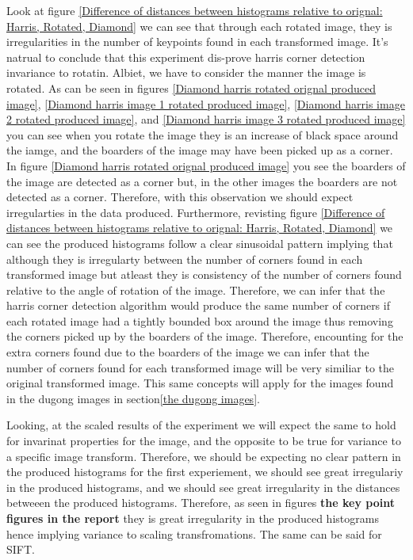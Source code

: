 \documentclass[conference]{IEEEtran}
\begin{document}
Look at figure \ref{Difference of distances between histograms relative to orignal: Harris, Rotated, Diamond} we can see that through each rotated image, they is irregularities in the number of keypoints found in each transformed image. It's natrual to conclude that this experiment dis-prove harris corner detection invariance to rotatin. Albiet, we have to consider the manner the image is rotated. As can be seen in figures \ref{Diamond harris rotated orignal produced image}, \ref{Diamond harris image 1 rotated produced image}, \ref{Diamond harris image 2 rotated produced image}, and \ref{Diamond harris image 3 rotated produced image} you can see when you rotate the image they is an increase of black space around the iamge, and the boarders of the image may have been picked up as a corner. In figure \ref{Diamond harris rotated orignal produced image} you see the boarders of the image are detected as a corner but, in the other images the boarders are not detected as a corner. Therefore, with this observation we should expect irregularties in the data produced. Furthermore, revisting figure \ref{Difference of distances between histograms relative to orignal: Harris, Rotated, Diamond} we can see the produced histograms follow a clear sinusoidal pattern implying that although they is irregularty between the number of corners found in each transformed image but atleast they is consistency of the number of corners found relative to the angle of rotation of the image. Therefore, we can infer that the harris corner detection algorithm would produce the same number of corners if each rotated image had a tightly bounded box around the image thus removing the corners picked up by the boarders of the image. Therefore, encounting for the extra corners found due to the boarders of the image we can infer that the number of corners found for each transformed image will be very similiar to the original transformed image. This same concepts will apply for the images found in the dugong images in section\ref{the dugong images}.\par

Looking, at the scaled results of the experiment we will expect the same to hold for invarinat properties for the image, and the opposite to be true for variance to a specific image transform. Therefore, we should be expecting no clear pattern in the produced histograms for the first experiement, we should see great irregulariy in the produced histograms, and we should see great irregularity in the distances betweeen the produced histograms. Therefore, as seen in figures \textbf{the key point figures in the report} they is great irregularity in the produced histograms hence implying variance to scaling transfromations. The same can be said for SIFT.
\end{document}
